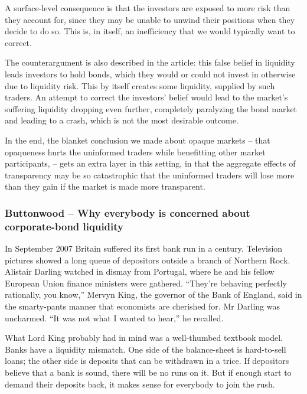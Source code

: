 \begin{solution}
	A surface-level consequence is that the investors are exposed to more risk than they account for, since they may be unable to unwind their positions when they decide to do so. This is, in itself, an inefficiency that we would typically want to correct.
	
	The counterargument is also described in the article: this false belief in liquidity leads investors to hold bonds, which they would or could not invest in otherwise due to liquidity risk. This by itself creates some liquidity, supplied by such traders. An attempt to correct the investors' belief would lead to the market's suffering liquidity dropping even further, completely paralyzing the bond market and leading to a crash, which is not the most desirable outcome.
	
	In the end, the blanket conclusion we made about opaque markets -- that opaqueness hurts the uninformed traders while benefitting other market participants, -- gets an extra layer in this setting, in that the aggregate effects of transparency may be so catastrophic that the uninformed traders will lose more than they gain if the market is made more transparent.
\end{solution}


\subsubsection*{Buttonwood -- Why everybody is concerned about corporate-bond liquidity}

In September 2007 Britain suffered its first bank run in a century. Television pictures showed a long queue of depositors outside a branch of Northern Rock. Alistair Darling watched in dismay from Portugal, where he and his fellow European Union finance ministers were gathered. ``They’re behaving perfectly rationally, you know,'' Mervyn King, the governor of the Bank of England, said in the smarty-pants manner that economists are cherished for. Mr Darling was uncharmed. ``It was not what I wanted to hear,'' he recalled.

What Lord King probably had in mind was a well-thumbed textbook model. Banks have a liquidity mismatch. One side of the balance-sheet is hard-to-sell loans; the other side is deposits that can be withdrawn in a trice. If depositors believe that a bank is sound, there will be no runs on it. But if enough start to demand their deposits back, it makes sense for everybody to join the rush.

